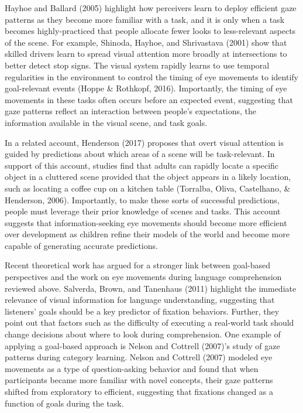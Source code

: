 \documentclass[,man,floatsintext]{apa6}
\begin{document}
Hayhoe and Ballard (2005) highlight how perceivers learn to deploy efficient gaze patterns as they become more familiar with a task, and it is only when a task becomes highly-practiced that people allocate fewer looks to less-relevant aspects of the scene. For example, Shinoda, Hayhoe, and Shrivastava (2001) show that skilled drivers learn to spread visual attention more broadly at intersections to better detect stop signs. The visual system rapidly learns to use temporal regularities in the environment to control the timing of eye movements to identify goal-relevant events (Hoppe \& Rothkopf, 2016). Importantly, the timing of eye movements in these tasks often occurs before an expected event, suggesting that gaze patterns reflect an interaction between people's expectations, the information available in the visual scene, and task goals.

In a related account, Henderson (2017) proposes that overt visual attention is guided by predictions about which areas of a scene will be task-relevant. In support of this account, studies find that adults can rapidly locate a specific object in a cluttered scene provided that the object appears in a likely location, such as locating a coffee cup on a kitchen table (Torralba, Oliva, Castelhano, \& Henderson, 2006). Importantly, to make these sorts of successful predictions, people must leverage their prior knowledge of scenes and tasks. This account suggests that information-seeking eye movements should become more efficient over development as children refine their models of the world and become more capable of generating accurate predictions.

Recent theoretical work has argued for a stronger link between goal-based perspectives and the work on eye movements during language comprehension reviewed above. Salverda, Brown, and Tanenhaus (2011) highlight the immediate relevance of visual information for language understanding, suggesting that listeners' goals should be a key predictor of fixation behaviors. Further, they point out that factors such as the difficulty of executing a real-world task should change decisions about where to look during comprehension. One example of applying a goal-based approach is Nelson and Cottrell (2007)'s study of gaze patterns during category learning. Nelson and Cottrell (2007) modeled eye movements as a type of question-asking behavior and found that when participants became more familiar with novel concepts, their gaze patterns shifted from exploratory to efficient, suggesting that fixations changed as a function of goals during the task.
\end{document}
